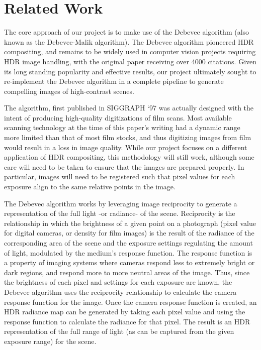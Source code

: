 \documentclass[
	a4paper, %
	10pt, %
	unnumberedsections, %
	twoside, %
]{LTJournalArticle}
\begin{document}

\section{Related Work}

The core approach of our project is to make use of the Debevec algorithm (also known as the Debevec-Malik algorithm). The Debevec algorithm pioneered HDR compositing, and remains to be widely used in computer vision projects requiring HDR image handling, with the original paper receiving over 4000 citations. Given its long standing popularity and effective results, our project ultimately sought to re-implement the Debevec algorithm in a complete pipeline to generate compelling images of high-contrast scenes. 

The algorithm, first published in SIGGRAPH ‘97 was actually designed with the intent of producing high-quality digitizations of film scans. Most available scanning technology at the time of this paper’s writing had a dynamic range more limited than that of most film stocks, and thus digitizing images from film would result in a loss in image quality. While our project focuses on a different application of HDR compositing, this methodology will still work, although some care will need to be taken to ensure that the images are prepared properly. In particular, images will need to be registered such that pixel values for each exposure align to the same relative points in the image.

The Debevec algorithm works by leveraging image reciprocity to generate a representation of the full light -or radiance- of the scene. Reciprocity is the relationship in which the brightness of a given point on a photograph (pixel value for digital cameras, or density for film images) is the result of the radiance of the corresponding area of the scene and the exposure settings regulating the amount of light, modulated by the medium’s response function. The response function is a property of imaging systems where cameras respond less to extremely bright or dark regions, and respond more to more neutral areas of the image. Thus, since the brightness of each pixel and settings for each exposure are known, the Debevec algorithm uses the reciprocity relationship to calculate the camera response function for the image. Once the camera response function is created, an HDR radiance map can be generated by taking each pixel value and using the response function to calculate the radiance for that pixel. The result is an HDR representation of the full range of light (as can be captured from the given exposure range) for the scene.
\end{document}
